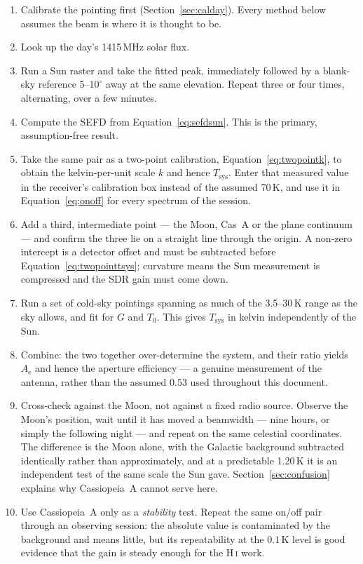 \documentclass[11pt,a4paper]{article}
\begin{document}
\begin{enumerate}
    \item Calibrate the pointing first (Section~\ref{sec:calday}). Every method below assumes the beam is where it is thought to be.
    \item Look up the day's 1415\,MHz solar flux.
    \item Run a Sun raster and take the fitted peak, immediately followed by a blank-sky reference $5$--$10^\circ$ away at the same elevation. Repeat three or four times, alternating, over a few minutes.
    \item Compute the SEFD from Equation~\eqref{eq:sefdsun}. This is the primary, assumption-free result.
    \item Take the same pair as a two-point calibration, Equation~\eqref{eq:twopointk}, to obtain the kelvin-per-unit scale $k$ and hence $T_\text{sys}$. Enter that measured value in the receiver's calibration box instead of the assumed 70\,K, and use it in Equation~\eqref{eq:onoff} for every spectrum of the session.
    \item Add a third, intermediate point --- the Moon, Cas~A or the plane continuum --- and confirm the three lie on a straight line through the origin. A non-zero intercept is a detector offset and must be subtracted before Equation~\eqref{eq:twopointtsys}; curvature means the Sun measurement is compressed and the SDR gain must come down.
    \item Run a set of cold-sky pointings spanning as much of the 3.5--30\,K range as the sky allows, and fit for $G$ and $T_0$. This gives $T_\text{sys}$ in kelvin independently of the Sun.
    \item Combine: the two together over-determine the system, and their ratio yields $A_\text{e}$ and hence the aperture efficiency --- a genuine measurement of the antenna, rather than the assumed $0.53$ used throughout this document.
    \item Cross-check against the Moon, not against a fixed radio source. Observe the Moon's position, wait until it has moved a beamwidth --- nine hours, or simply the following night --- and repeat on the same celestial coordinates. The difference is the Moon alone, with the Galactic background subtracted identically rather than approximately, and at a predictable 1.20\,K it is an independent test of the same scale the Sun gave. Section~\ref{sec:confusion} explains why Cassiopeia~A cannot serve here.
    \item Use Cassiopeia~A only as a \emph{stability} test. Repeat the same on/off pair through an observing session: the absolute value is contaminated by the background and means little, but its repeatability at the $0.1$\,K level is good evidence that the gain is steady enough for the H\,\textsc{i} work.
\end{enumerate}
\end{document}
